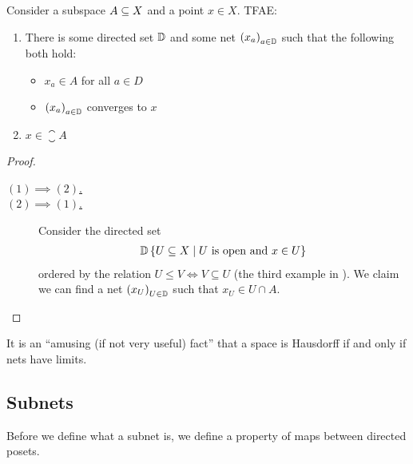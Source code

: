 \begin{boxproposition}
    Consider a subspace $A \subseteq X$ and a point $x \in X$. TFAE:
    \begin{enumerate}[label = (\arabic*)]
        \item There is some directed set $\mathbb{D}$ and some net $\left( x_a \right)_{a \in \mathbb{D}}$ such that the following both hold:
        \begin{itemize}
            \item $x_a \in A$ for all $a \in D$
            \item $\left( x_a \right)_{a \in \mathbb{D}}$ converges to $x$
        \end{itemize}

        \item $x \in \closure{A}$
    \end{enumerate}
\end{boxproposition}
\begin{proof}\hfill
    \begin{description}
        \item[\underline{$(1) \implies (2)$.}]
        \sorry %

        \item[\underline{$(2) \implies (1)$.}]
        Consider the directed set
        \begin{align*}
            \mathbb{D} \left\{ U \subseteq X \; \middle\vert \; U \text{ is open and } x \in U \right\}
        \end{align*}
        ordered by the relation $U \leq V \iff V \subseteq U$ (the third example in ). We claim we can find a net $\left( x_U \right)_{U \in \mathbb{D}}$ such that $x_U \in U \cap A$. \sorry
    \end{description}
\end{proof}
It is an ``amusing (if not very useful) fact'' that a space is Hausdorff if and only if nets have limits.

\subsection{Subnets}
Before we define what a subnet is, we define a property of maps between directed posets.

